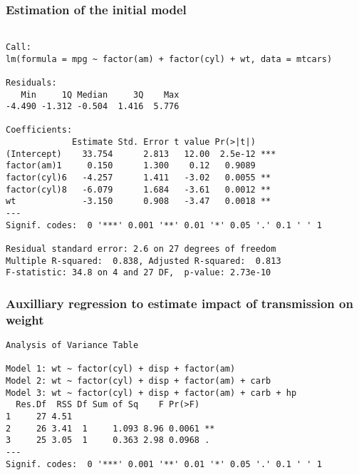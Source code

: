 \documentclass[5pt,]{article}
\begin{document}
\subsubsection{Estimation of the initial
model}\label{estimation-of-the-initial-model}

\begin{verbatim}

Call:
lm(formula = mpg ~ factor(am) + factor(cyl) + wt, data = mtcars)

Residuals:
   Min     1Q Median     3Q    Max 
-4.490 -1.312 -0.504  1.416  5.776 

Coefficients:
             Estimate Std. Error t value Pr(>|t|)    
(Intercept)    33.754      2.813   12.00  2.5e-12 ***
factor(am)1     0.150      1.300    0.12   0.9089    
factor(cyl)6   -4.257      1.411   -3.02   0.0055 ** 
factor(cyl)8   -6.079      1.684   -3.61   0.0012 ** 
wt             -3.150      0.908   -3.47   0.0018 ** 
---
Signif. codes:  0 '***' 0.001 '**' 0.01 '*' 0.05 '.' 0.1 ' ' 1

Residual standard error: 2.6 on 27 degrees of freedom
Multiple R-squared:  0.838, Adjusted R-squared:  0.813 
F-statistic: 34.8 on 4 and 27 DF,  p-value: 2.73e-10
\end{verbatim}

\subsubsection{Auxilliary regression to estimate impact of transmission
on
weight}\label{auxilliary-regression-to-estimate-impact-of-transmission-on-weight}

\begin{verbatim}
Analysis of Variance Table

Model 1: wt ~ factor(cyl) + disp + factor(am)
Model 2: wt ~ factor(cyl) + disp + factor(am) + carb
Model 3: wt ~ factor(cyl) + disp + factor(am) + carb + hp
  Res.Df  RSS Df Sum of Sq    F Pr(>F)   
1     27 4.51                            
2     26 3.41  1     1.093 8.96 0.0061 **
3     25 3.05  1     0.363 2.98 0.0968 . 
---
Signif. codes:  0 '***' 0.001 '**' 0.01 '*' 0.05 '.' 0.1 ' ' 1
\end{verbatim}
\end{document}
